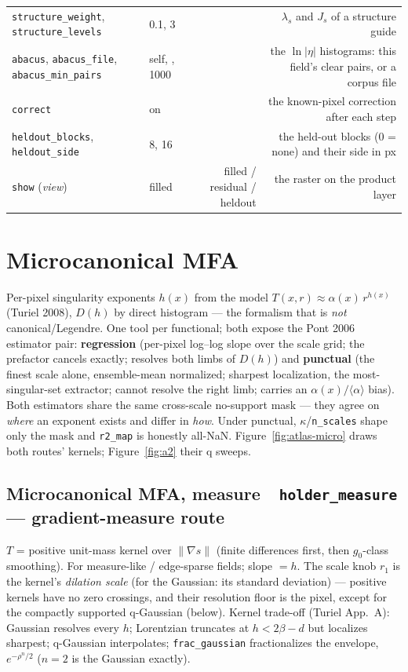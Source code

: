 \documentclass[10pt]{article}
\newcommand{\dev}[1]{\texttt{#1}}
\newcommand{\tool}[2]{#1~\textperiodcentered~\dev{#2}}
\begin{document}
\begin{longtable}{P l R N}
\texttt{structure\_weight}, \texttt{structure\_levels} & 0.1, 3 & & $\lambda_s$ and $J_s$ of a structure guide \\
\texttt{abacus}, \texttt{abacus\_file}, \texttt{abacus\_min\_pairs} & self, , 1000 & & the $\ln|\eta|$ histograms: this field's clear pairs, or a corpus file \\
\texttt{correct} & on & & the known-pixel correction after each step \\
\texttt{heldout\_blocks}, \texttt{heldout\_side} & 8, 16 & & the held-out blocks (0 = none) and their side in px \\
\texttt{show} (\emph{view}) & filled & filled / residual / heldout & the raster on the product layer \\
\bottomrule
\end{longtable}

\section{Microcanonical MFA}\label{sec:micro}
Per-pixel singularity exponents $h(x)$ from the model
$T(x,r)\approx\alpha(x)\,r^{h(x)}$ (Turiel 2008), $D(h)$ by direct histogram --- the
formalism that is \emph{not} canonical/Legendre. One tool per functional; both expose the
Pont 2006 estimator pair: \textbf{regression} (per-pixel log--log slope over the scale
grid; the prefactor cancels exactly; resolves both limbs of $D(h)$) and
\textbf{punctual} (the finest scale alone, ensemble-mean normalized; sharpest
localization, the most-singular-set extractor; cannot resolve the right limb; carries an
$\alpha(x)/\langle\alpha\rangle$ bias). Both estimators share the same cross-scale
no-support mask --- they agree on \emph{where} an exponent exists and differ in
\emph{how}. Under punctual, $\kappa$/\texttt{n\_scales} shape only the mask and
\texttt{r2\_map} is honestly all-NaN. Figure~\ref{fig:atlas-micro} draws both routes' kernels; Figure~\ref{fig:a2} their q sweeps.

\subsection{\tool{Microcanonical MFA, measure}{holder\_measure} --- gradient-measure route}
$T$ = positive unit-mass kernel over $\lVert\nabla s\rVert$ (finite differences first,
then $g_0$-class smoothing). For measure-like / edge-sparse fields; slope $=h$.
The scale knob $r_1$ is the kernel's \emph{dilation scale} (for the Gaussian: its
standard deviation) --- positive kernels have no zero crossings, and their resolution
floor is the pixel, except for the compactly supported q-Gaussian (below). Kernel trade-off (Turiel App.~A): Gaussian resolves every $h$;
Lorentzian truncates at $h<2\beta-d$ but localizes sharpest; q-Gaussian interpolates;
\texttt{frac\_gaussian} fractionalizes the envelope, $e^{-\rho^{n}/2}$ ($n{=}2$ is the
Gaussian exactly).
\end{document}
